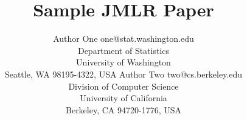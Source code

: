 \documentclass[twoside,10pt]{article}
\begin{document}
\title{Sample JMLR Paper}

\author{\name Author One \email one@stat.washington.edu \\
       \addr Department of Statistics\\
       University of Washington\\
       Seattle, WA 98195-4322, USA
       \AND
       \name Author Two \email two@cs.berkeley.edu \\
       \addr Division of Computer Science\\
       University of California\\
       Berkeley, CA 94720-1776, USA}


\begin{figure}[htb]
  \centering
  \newcommand{\imgwidth}{0.22\textwidth}


\end{figure}
\end{document}

